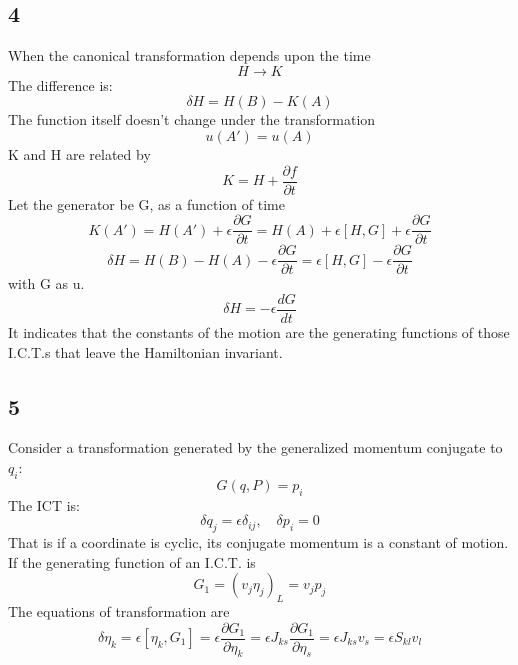 \documentclass[12pt]{article}
\begin{document}
	\subsection*{4}
	When the canonical transformation depends upon the time
	\begin{equation*}
		H \rightarrow K
	\end{equation*}
	The difference is: 
	\begin{equation*}
		\delta H = H(B) - K(A)
	\end{equation*}
	The function itself doesn't change under the transformation
	\begin{equation*}
		u(A') = u(A)
	\end{equation*}
	K and H are related by
	\begin{equation*}
		K = H + \frac{\partial f}{\partial t}
	\end{equation*}
	Let the generator be G, as a function of time
	\begin{equation*}
		K(A') = H(A') + \epsilon \frac{\partial G}{\partial t} = H(A) + \epsilon[H, G] + \epsilon \frac{\partial G}{\partial t}
	\end{equation*}
	\begin{equation*}
		\delta H = H(B) - H(A) - \epsilon \frac{\partial G}{\partial t} = \epsilon[H, G] - \epsilon \frac{\partial G}{\partial t}
	\end{equation*}
	with G as u.
	\begin{equation*}
		\delta H = -\epsilon \frac{dG}{dt}
	\end{equation*}
	It indicates that the constants of the motion are the generating functions of those I.C.T.s that leave the Hamiltonian invariant.
	
	\subsection*{5}
	Consider a transformation generated by the generalized momentum conjugate to $q_i$:
	\begin{equation*}
		G(q, P) = p_i
	\end{equation*}
	The ICT is:
	\begin{equation*}
		\delta q_j = \epsilon \delta_{ij}, \quad \delta p_i = 0
	\end{equation*}
	That is if a coordinate is cyclic, its conjugate momentum is a constant of motion.
	If the generating function of an I.C.T. is
	\begin{equation*}
		G_1 = (v_j \eta_j)_L = v_j p_j
	\end{equation*}
	The equations of transformation are
	\begin{equation*}
		\delta \eta_k = \epsilon [ \eta_k, G_1 ] = \epsilon \frac{\partial G_1}{\partial \eta_k} = \epsilon J_{ks} \frac{\partial G_1}{\partial \eta_s} = \epsilon J_{ks} v_s = \epsilon S_{kl} v_l
	\end{equation*}
	
\end{document}
